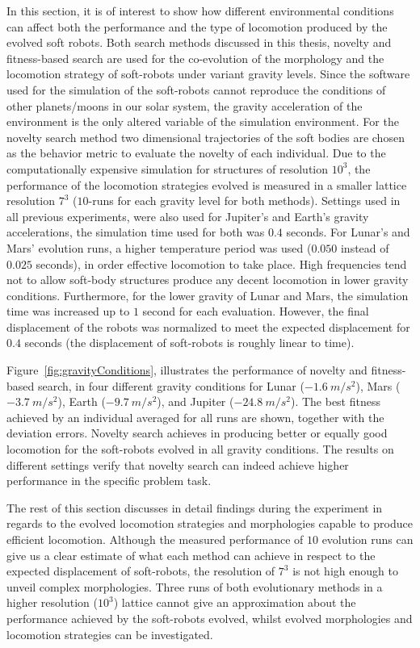 In this section, it is of interest to show how different environmental conditions can affect both the performance and the type of locomotion produced by the evolved soft robots. Both search methods discussed in this thesis, novelty and fitness-based search are used for the co-evolution of the morphology and the locomotion strategy of soft-robots under variant gravity levels. Since the software used for the simulation of the soft-robots cannot reproduce the conditions of other planets/moons in our solar system, the gravity acceleration of the environment is the only altered variable of the simulation environment. For the novelty search method two dimensional trajectories of the soft bodies are chosen as the behavior metric to evaluate the novelty of each individual. Due to the computationally expensive simulation for structures of resolution $10^3$, the performance of the locomotion strategies evolved is measured in a smaller lattice resolution $7^3$ ($10$-runs for each gravity level for both methods). Settings used in all previous experiments, were also used for Jupiter's and Earth's gravity accelerations, the simulation time used for both was $0.4$ seconds. For Lunar's and Mars' evolution runs, a higher temperature period was used ($0.050$ instead of $0.025$ seconds), in order effective locomotion to take place. High frequencies tend not to allow soft-body structures produce any decent locomotion in lower gravity conditions. Furthermore, for the lower gravity of Lunar and Mars, the simulation time was increased up to $1$ second for each evaluation. However, the final displacement of the robots was normalized to meet the expected displacement for $0.4$ seconds (the displacement of soft-robots is roughly linear to time).

Figure~\ref{fig:gravityConditions}, illustrates the performance of novelty and fitness-based search, in four different gravity conditions for Lunar ($-1.6~m/s^2$), Mars ($-3.7~m/s^2$), Earth ($-9.7~m/s^2$), and Jupiter ($-24.8~m/s^2$). The best fitness achieved by an individual averaged for all runs are shown, together with the deviation errors. Novelty search achieves in producing better or equally good locomotion for the soft-robots evolved in all gravity conditions. The results on different settings verify that novelty search can indeed achieve higher performance in the specific problem task. 

The rest of this section discusses in detail findings during the experiment in regards to the evolved locomotion strategies and morphologies capable to produce efficient locomotion. Although the measured performance of $10$ evolution runs can give us a clear estimate of what each method can achieve in respect to the expected displacement of soft-robots, the resolution of $7^3$ is not high enough to unveil complex morphologies. Three runs of both evolutionary methods in a higher resolution ($10^3$) lattice cannot give an approximation about the performance achieved by the soft-robots evolved, whilst evolved morphologies and locomotion strategies can be investigated.



